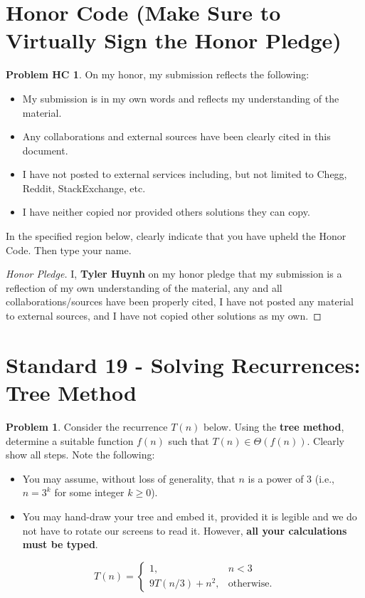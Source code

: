 \documentclass[11pt]{article}
\theoremstyle{definition}
\theoremstyle{definition}
\newtheorem{required}{Problem}
\newtheorem*{requiredHC}{Problem HC}
\theoremstyle{definition}
\begin{document}
\section*{Honor Code (Make Sure to Virtually Sign the Honor Pledge)} 
\hypertarget{HonorCode}{}

\begin{requiredHC}
On my honor, my submission reflects the following:
\begin{itemize}
\item My submission is in my own words and reflects my understanding of the material.
\item Any collaborations and external sources have been clearly cited in this document.
\item I have not posted to external services including, but not limited to Chegg, Reddit, StackExchange, etc.
\item I have neither copied nor provided others solutions they can copy.
\end{itemize}

\noindent In the specified region below, clearly indicate that you have upheld the Honor Code. Then type your name. 
\end{requiredHC}

\begin{proof}[Honor Pledge]
I, \textbf{Tyler Huynh} on my honor pledge that my submission is a reflection of my own understanding of the material, any and all collaborations/sources have been properly cited, I have not posted any material to external sources, and I have not copied other solutions as my own.
\end{proof}



\newpage
\setcounter{section}{18}
\section{Standard 19 - Solving Recurrences: Tree Method}

\setcounter{required}{18}
\begin{required} 
Consider the recurrence $T(n)$ below. Using the {\bf tree method}, determine a suitable function $f(n)$ such that $T(n) \in \Theta(f(n))$. Clearly show all steps. Note the following:
\begin{itemize}
\item You may assume, without loss of generality, that $n$ is a power of $3$ (i.e., $n = 3^{k}$ for some integer $k \geq 0$).
\item You may hand-draw your tree and embed it, provided it is legible and we do not have to rotate our screens to read it. However, \textbf{all your calculations must be typed}.
\end{itemize}

\[
T(n) = \begin{cases} 1, &  n < 3 \\ 
9T(n/3) + n^{2}, &  \text{otherwise.} \end{cases}
\]

\end{required}
\end{document}
